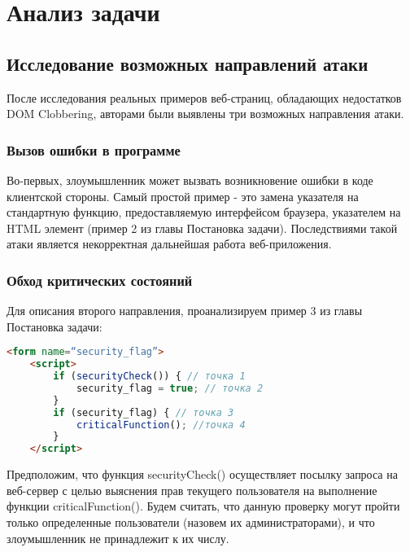 
\chapter{Анализ задачи}\label{Analysis}

\section{Исследование возможных направлений атаки}

После исследования реальных примеров веб-страниц, обладающих недостатков DOM Clobbering, авторами были выявлены три возможных направления атаки.
\bigskip

\subsection{Вызов ошибки в программе}
Во-первых, злоумышленник может вызвать возникновение ошибки в коде клиентской стороны. Самый простой пример - это замена указателя на стандартную функцию, предоставляемую интерфейсом браузера, указателем на HTML элемент (пример 2 из главы Постановка задачи). Последствиями такой атаки является некорректная дальнейшая работа веб-приложения.

\subsection{Обход критических состояний}
Для описания второго направления, проанализируем пример 3 из главы Постановка задачи:

\begin{lstlisting}[language=HTML]
	<form name=“security_flag”>
	<script>
		if (securityCheck()) { // точка 1
			security_flag = true; // точка 2
		}
		if (security_flag) { // точка 3
			criticalFunction(); //точка 4
		}
	</script>
\end{lstlisting}
\bigskip

Предположим, что функция securityCheck() осуществляет посылку запроса на веб-сервер с целью выяснения прав текущего пользователя на выполнение функции criticalFunction(). Будем считать, что данную проверку могут пройти только определенные пользователи (назовем их администраторами), и что злоумышленник не принадлежит к их числу.


